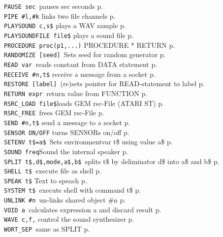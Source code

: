 \begin{tabbing}
{\tt PAUSE sec		}\>pauses sec seconds\> p.\pageref{PAUSE}\\
\verb|PIPE #l,#k|  \>     links two file channels        \> p.\pageref{PIPE}\\
\verb|PLAYSOUND c,s$|  \> plays a WAV sample  \> p.\pageref{PLAYSOUND}\\
\verb|PLAYSOUNDFILE file$|  \> plays a sound file  \> p.\pageref{PLAYSOUNDFILE}\\
{\tt PROCEDURE proc(p1,...)} \>PROCEDURE * RETURN\> p.\pageref{PROCEDURE}\\
{\tt RANDOMIZE [seed]	}\>Sets seed for random generator\> p.\pageref{RANDOMIZE}\\
{\tt READ var		}\>reads constant from DATA statement\> p.\pageref{READ}\\
\verb|RECEIVE #n,t$|  \> receive a message from a socket \> p.\pageref{RECEIVE}\\
{\tt RESTORE [label] 	}\>(re)sets pointer for READ-statement to label\> p.\pageref{RESTORE}\\
{\tt RETURN expr	}\>return value from FUNCTION\> p.\pageref{RETURN}\\
{\tt RSRC\_LOAD file\$}\>loads GEM rsc-File (ATARI ST)\> p.\pageref{RSRCiLOAD}\\
{\tt RSRC\_FREE		}\>frees GEM rsc-File\> p.\pageref{RSRCiFREE}\\
\verb|SEND #n,t$|  \> send a message to a socket \> p.\pageref{SEND}\\

\verb|SENSOR ON/OFF|  \> turns SENSORs on/off             \> p.\pageref{SENSOR}\\

{\tt SETENV t\$=a\$	}\>Sets environmentvar t\$ using value a\$\> p.\pageref{SETENV}\\
\verb|SOUND freq|\>Sound the internal speaker\> p.\pageref{SOUND}\\
{\tt SPLIT t\$,d\$,mode,a\$,b\$ }\>splits t\$ by deliminator d\$ into a\$ and b\$\> p.\pageref{SPLIT}\\
{\tt SHELL t\$		}\>execute file as shell \> p.\pageref{SHELL}\\
\verb|SPEAK t$|  \> Text to speach  \> p.\pageref{SPEAK}\\
{\tt SYSTEM t\$		}\>execute shell with command t\$\> p.\pageref{SYSTEM}\\
{\tt UNLINK \#n		}\>un-links shared object \#n\> p.\pageref{UNLINK}\\
{\tt VOID a  		}\>calculates expression a and discard result\> p.\pageref{VOIDbABBREVpbt}\\
\verb|WAVE c,f,|\> control the sound synthesizer\> p.\pageref{WAVE}\\

{\tt WORT\_SEP }\>same as SPLIT \> p.\pageref{WORTiSEP}\\
 \end{tabbing}
 
